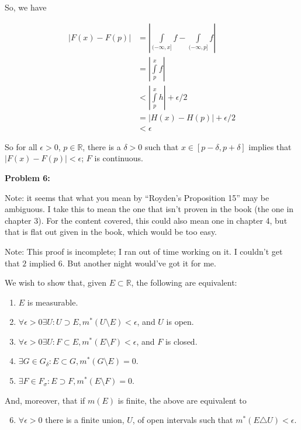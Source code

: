 \documentclass[a4paper,12pt]{article}
\newcommand{\shunt}{\vspace{20mm}}
\newcommand{\absval}[1]{\left\lvert #1 \right\rvert}
\newcommand{\de}{\delta}
\newcommand{\ep}{\epsilon}
\newcommand{\si}{\sigma}
\newcommand{\R}{\mathbb{R}}
\begin{document}
So, we have

\begin{align*}
\absval{F(x)-F(p)} &= \absval{\int\limits_{(-\infty,x]} f - \int\limits_{(-\infty,p]} f} \\
&=\absval{\int\limits_p^x f} \\
&<\absval{\int\limits_p^x h} + \ep/2 \\
&=\absval{H(x)-H(p)} + \ep/2\\
&< \ep
\end{align*}

So for all $\ep>0$, $p \in \R$, there is a $\de >0$ such that $x \in [p-\de, p+\de]$ implies that $\absval{F(x)-F(p)} < \ep$; $F$ is continuous.

\shunt

{\bf Problem 6:}

Note: it seems that what you mean by ``Royden's Proposition 15'' may be ambiguous. I take this to mean the one that isn't proven in the book (the one in chapter 3). For the content covered, this could also mean one in chapter 4, but that is flat out given in the book, which would be too easy.

Note: This proof is incomplete; I ran out of time working on it. I couldn't get that $2$ implied $6$. But another night would've got it for me.

We wish to show that, given $E \subset \R$, the following are equivalent:

\begin{enumerate}
\item $E$ is measurable.
\item $\forall \ep >0 \exists U: U \supset E, m^*(U \setminus E) < \ep$, and $U$ is open.
\item $\forall \ep >0 \exists U: F \subset E, m^*(E \setminus F) < \ep$, and $F$ is closed.
\item $\exists G \in G_\de : E \subset G, m^*(G \setminus E) = 0$.
\item $\exists F \in F_\si : E \supset F, m^*(E \setminus F) = 0$.
\end{enumerate}

And, moreover, that if $m(E)$ is finite, the above are equivalent to

\begin{enumerate}
\setcounter{enumi}{5}
\item $\forall \ep >0$ there is a finite union, $U$, of open intervals such that $m^*(E \triangle U) < \ep$.
\end{enumerate}
\end{document}
